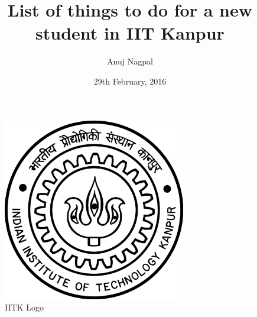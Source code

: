 \documentclass[11pt]{article}
\title{List of things to do for a new student in IIT Kanpur}
\author{Anuj Nagpal}
\date{29th February, 2016}
\begin{document}
\maketitle

\tableofcontents

\listoffigures
 
\listoftables

\newpage

\begin{figure}[H]
\centering
\includegraphics[width=8cm, height=8cm]
{iitklogo}
\caption{IITK Logo}
\label{figure:1}
\end{figure}
\end{document}
